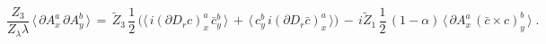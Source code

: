 \begin{equation}
  \label{ghDSEs2}
   \frac{Z_3}{Z_\lambda \lambda} \,  \langle \,
      \partial A^a_x \, \partial A^b_y \, \rangle \, = \,   \widetilde Z_3 \,
       \frac{1}{2} \, \Big( \langle  \, i (\partial D_r c)^a_x \, \bar c^b_y\,
  \rangle \,  + \,  \langle  \,  c^b_y\,  i(\partial D_r \bar c)^a_x \,
  \rangle \Big) \, - \,
 i\widetilde Z_1 \,\frac{1}{2} \, (1-\alpha )  \, \langle \, \partial
      A^a_x \,       (\bar c \times c )^b_y \, \rangle \;.
\end{equation}

